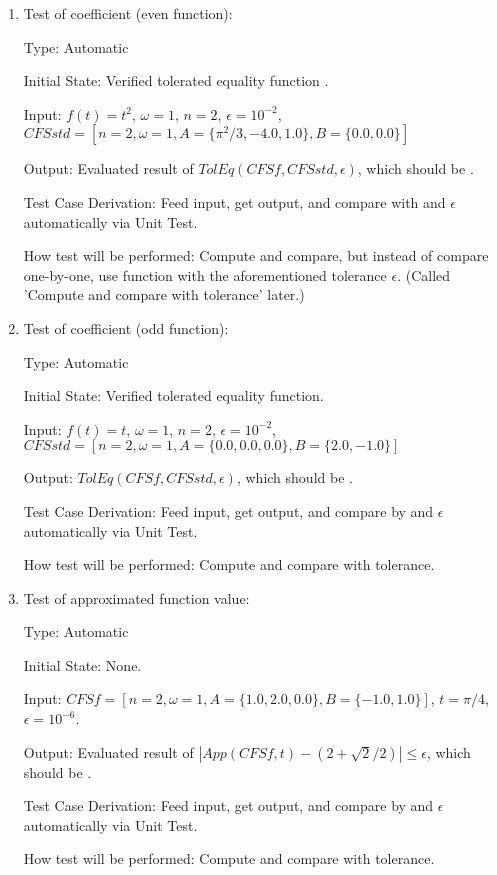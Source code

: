 \documentclass[12pt, titlepage]{article}
\begin{document}
\begin{enumerate}
	\item{Test of coefficient (even function):\\}
	
	Type: Automatic
	
	Initial State: Verified tolerated equality function .
	
	Input: $f(t)=t^2$, $\omega=1$, $n=2$, $\epsilon=10^{-2}$,
        $\mathit{CFSstd}=[n=2,\omega=1, A=\{\pi^2/3, -4.0, 1.0\}, B=\{0.0,
        0.0\}]$
	
	Output: Evaluated result of
        $\mathit{TolEq}(\mathit{CFSf}, \mathit{CFSstd}, \epsilon)$, which should
        be . 
	
	Test Case Derivation: Feed input, get output, and compare with  and $\epsilon$ automatically via Unit Test.
	
	How test will be performed: Compute and compare, but instead of compare one-by-one, use  function with the aforementioned tolerance $\epsilon$. (Called 'Compute and compare with tolerance' later.)
	
	\item{Test of coefficient (odd function):\\}
	
	Type: Automatic	
	
	Initial State: Verified tolerated equality function.
	
	Input: $f(t)=t$, $\omega=1$, $n=2$, $\epsilon=10^{-2}$,
        $\mathit{CFSstd}=[n=2,\omega=1, A=\{0.0, 0.0, 0.0\}, B=\{2.0, -1.0\}]$
	
	Output: $\mathit{TolEq}(\mathit{CFSf}, \mathit{CFSstd}, \epsilon)$,
        which should be .
	
	Test Case Derivation: Feed input, get output, and compare by  and $\epsilon$ automatically via Unit Test.
	
	
	How test will be performed: Compute and compare with tolerance.
	
	\item{Test of approximated function value: \\}
	
	Type: Automatic
	
	Initial State: None.
	
	Input: $\mathit{CFSf}=[n=2,\omega=1, A=\{1.0, 2.0, 0.0\}, B=\{-1.0,
        1.0\}]$, $t=\pi/4$, $\epsilon=10^{-6}$.
	
	Output: Evaluated result of
        $|\mathit{App}(\mathit{CFSf}, t)-(2+\sqrt{2}/2)|\leq\epsilon$, which
        should be .
	
	Test Case Derivation: Feed input, get output, and compare by  and $\epsilon$ automatically via Unit Test.
	
	
	How test will be performed: Compute and compare with tolerance.
	
\end{enumerate}
\end{document}
